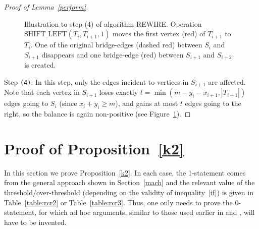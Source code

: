 \documentclass[reqno, 12pt]{amsart}
\numberwithin{equation}{section}
\numberwithin{figure}{section}
\let\setminus=\smallsetminus
\theoremstyle{plain}
\theoremstyle{definition}
\begin{document}
\begin{proof}[Proof of Lemma~\ref{perform}]
\begin{figure}[t]
{
}%

\caption{Illustration to step (4) of algorithm REWIRE. Operation  $\textrm{SHIFT\_LEFT}(T_{i},T_{i+1},1)$ moves the first vertex (red) of $T_{i+1}$ to $T_{i}$. One of the original bridge-edges (dashed red) between $S_{i}$ and $S_{i+1}$ disappears and one bridge-edge (red) between $S_{i+1}$ and $S_{i+2}$ is created.
}
\label{fig:step4}
\end{figure}	

Step \texttt{(4)}: In this step, only the edges incident to vertices in $S_{i+1}$ are affected. Note that each vertex in $S_{i+1}$ loses exactly $t=\min(m-y_i-x_{i+1},|T_{i+1}|)$ edges going to $S_i$ (since $x_i+y_i \ge m$), and gains at most $t$ edges going to the right, so the balance is again non-positive (see Figure~\ref{fig:step4}).
\end{proof}


\section{Proof of Proposition~\ref{k2}}\label{small}

In this section we prove Proposition~\ref{k2}.
In each case, the 1-statement comes from the general approach shown in Section~\ref{mach} and the relevant value of the threshold/over-threshold (depending on the validity of inequality~\eqref{if}) is given in Table~\ref{table:rcr2} or Table~\ref{table:rcr3}. Thus, one only needs to prove the 0-statement, for which ad hoc arguments, similar to those used earlier in \cite{ADRRS} and \cite{ADR}, will have to be invented.
\end{document}
